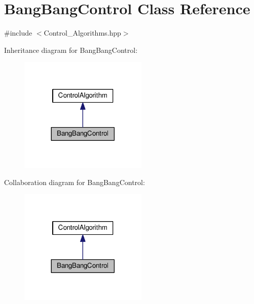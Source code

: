 \hypertarget{classBangBangControl}{}\section{Bang\+Bang\+Control Class Reference}
\label{classBangBangControl}


{\ttfamily \#include $<$Control\+\_\+\+Algorithms.\+hpp$>$}



Inheritance diagram for Bang\+Bang\+Control\+:\nopagebreak
\begin{figure}[H]
\begin{center}
\leavevmode
\includegraphics[width=173pt]{classBangBangControl__inherit__graph}
\end{center}
\end{figure}


Collaboration diagram for Bang\+Bang\+Control\+:
\nopagebreak
\begin{figure}[H]
\begin{center}
\leavevmode
\includegraphics[width=173pt]{classBangBangControl__coll__graph}
\end{center}
\end{figure}
